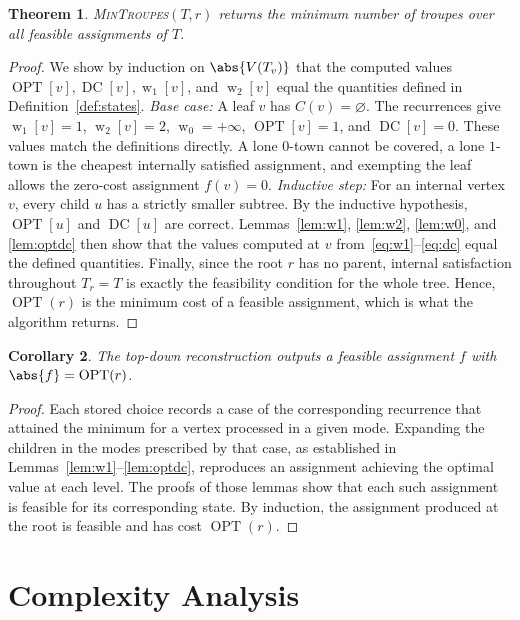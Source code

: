 \documentclass[11pt, a4paper]{article}
\newcommand{\OPT}{\operatorname{OPT}}
\newcommand{\DC}{\operatorname{DC}}
\newcommand{\with}[1]{\operatorname{w}_{#1}}  %
\newcommand{\Tv}{T_{v}}
\theoremstyle{plain}
\newtheorem{theorem}{Theorem}
\newtheorem{corollary}[theorem]{Corollary}
\theoremstyle{definition}
\begin{document}
\begin{theorem}
\textup{\textsc{MinTroupes}}$(T, r)$ returns the minimum number of troupes over
all feasible assignments of $T$.
\end{theorem}
\begin{proof}
We show by induction on $\abs{V(\Tv)}$ that the computed values
$\OPT[v], \DC[v], \with{1}[v]$, and $\with{2}[v]$ equal the quantities defined in
Definition~\ref{def:states}. \emph{Base case:} A leaf $v$ has
$C(v) = \varnothing$. The recurrences give $\with{1}[v] = 1$, $\with{2}[v] = 2$,
$\with{0} = +\infty$, $\OPT[v] = 1$, and $\DC[v] = 0$. These values match the
definitions directly. A lone $0$-town cannot be covered, a lone $1$-town is the
cheapest internally satisfied assignment, and exempting the leaf allows the
zero-cost assignment $f(v) = 0$. \emph{Inductive step:} For an internal vertex
$v$, every child $u$ has a strictly smaller subtree. By the inductive hypothesis,
$\OPT[u]$ and $\DC[u]$ are correct. Lemmas~\ref{lem:w1}, \ref{lem:w2},
\ref{lem:w0}, and \ref{lem:optdc} then show that the values computed at $v$
from~\eqref{eq:w1}--\eqref{eq:dc} equal the defined quantities. Finally, since the
root $r$ has no parent, internal satisfaction throughout $T_r = T$ is exactly the
feasibility condition for the whole tree. Hence, $\OPT(r)$ is the minimum cost of
a feasible assignment, which is what the algorithm returns.
\end{proof}

\begin{corollary}
The top-down reconstruction outputs a feasible assignment $f$ with
$\abs{f} = \OPT(r)$.
\end{corollary}
\begin{proof}
Each stored choice records a case of the corresponding recurrence that attained
the minimum for a vertex processed in a given mode. Expanding the children in the
modes prescribed by that case, as established in
Lemmas~\ref{lem:w1}--\ref{lem:optdc}, reproduces an assignment achieving the
optimal value at each level. The proofs of those lemmas show that each such
assignment is feasible for its corresponding state. By induction, the assignment
produced at the root is feasible and has cost $\OPT(r)$.
\end{proof}

\section{Complexity Analysis}
\end{document}

